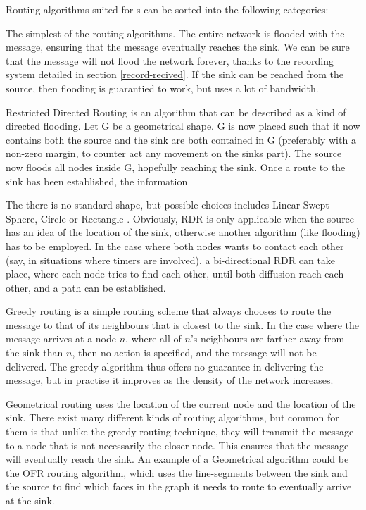 \documentclass[letter, 12pt, english, draft]{article}
\begin{document}
Routing algorithms suited for \manet s can be sorted into the following categories:
\begin{description}
{The simplest of the routing algorithms. The entire network is flooded with the message, ensuring that the message eventually reaches the sink. We can be sure that the message will not flood the network forever, thanks to the recording system detailed in section \ref{record-recived}. If the sink can be reached from the source, then flooding is  guarantied to work, but uses a lot of bandwidth.} 
{\cite{larMANET, Sur2}} 

      {Restricted Directed Routing is an algorithm that can be described as a kind of directed flooding. Let G be a geometrical shape. G is now placed such that it now contains both the source and the sink are both contained in G (preferably with a non-zero margin, to counter act any movement on the sinks part). The source now floods all nodes inside G, hopefully reaching the sink. Once a route to the sink has been established, the information

The there is no standard shape, but possible choices includes Linear Swept Sphere, Circle or Rectangle . Obviously, RDR is only applicable when the source has an idea of the location of the sink, otherwise another algorithm (like flooding) has to be employed. In the case where both nodes wants to contact each other (say, in situations where timers are involved), a bi-directional RDR can take place, where each node tries to find each other, until both diffusion reach each other, and a path can be established.}
{\cite{larMANET}}

{}

{Greedy routing is a simple routing scheme that always chooses to route the message to that of its neighbours that is closest to the sink. In the case where the message arrives at a node $n$, where all of $n$'s neighbours are farther away from the sink than $n$, then no action is specified, and the message will not be delivered. The greedy algorithm thus offers no guarantee in delivering the message, but in practise it improves as the density of the network increases.}
{}

{Geometrical routing uses the location of the current node and the location of the sink. There exist many different kinds of routing algorithms, but common for them is that unlike the greedy routing technique, they will transmit the message to a node that is not necessarily the closer node. This ensures that the message will eventually reach the sink. An example of a Geometrical algorithm could be the OFR \cite{gopher} routing algorithm, which uses the line-segments between the sink and the source to find which faces in the graph it needs to route to eventually arrive at the sink.}
{}


\end{description}
\end{document}
